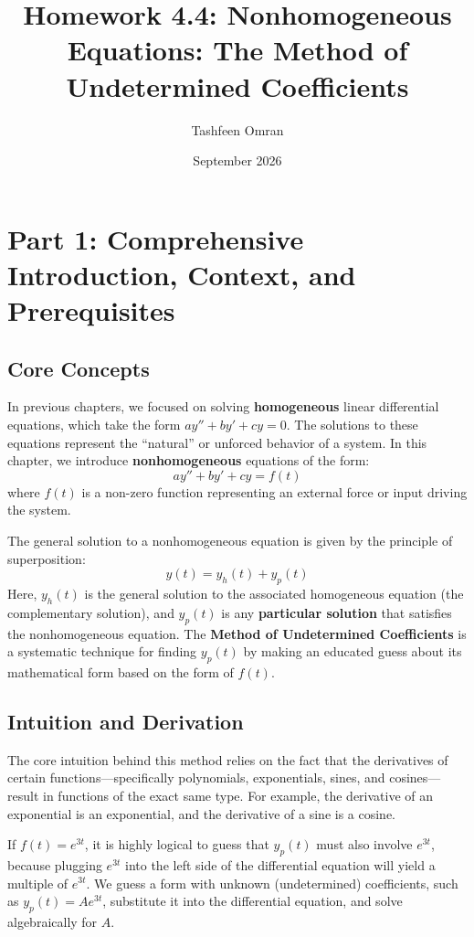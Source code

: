 \documentclass[12pt]{article}
\title{Homework 4.4: Nonhomogeneous Equations: The Method of Undetermined Coefficients}
\author{Tashfeen Omran}
\date{September 2026}
\begin{document}
\maketitle
\tableofcontents
\newpage

\section{Part 1: Comprehensive Introduction, Context, and Prerequisites}

\subsection{Core Concepts}
In previous chapters, we focused on solving \textbf{homogeneous} linear differential equations, which take the form $ay'' + by' + cy = 0$. The solutions to these equations represent the ``natural'' or unforced behavior of a system. In this chapter, we introduce \textbf{nonhomogeneous} equations of the form:
\[ ay'' + by' + cy = f(t) \]
where $f(t)$ is a non-zero function representing an external force or input driving the system. 

The general solution to a nonhomogeneous equation is given by the principle of superposition:
\[ y(t) = y_h(t) + y_p(t) \]
Here, $y_h(t)$ is the general solution to the associated homogeneous equation (the complementary solution), and $y_p(t)$ is any \textbf{particular solution} that satisfies the nonhomogeneous equation. The \textbf{Method of Undetermined Coefficients} is a systematic technique for finding $y_p(t)$ by making an educated guess about its mathematical form based on the form of $f(t)$.

\subsection{Intuition and Derivation}
The core intuition behind this method relies on the fact that the derivatives of certain functions---specifically polynomials, exponentials, sines, and cosines---result in functions of the exact same type. For example, the derivative of an exponential is an exponential, and the derivative of a sine is a cosine. 

If $f(t) = e^{3t}$, it is highly logical to guess that $y_p(t)$ must also involve $e^{3t}$, because plugging $e^{3t}$ into the left side of the differential equation will yield a multiple of $e^{3t}$. We guess a form with unknown (undetermined) coefficients, such as $y_p(t) = A e^{3t}$, substitute it into the differential equation, and solve algebraically for $A$.
\end{document}
